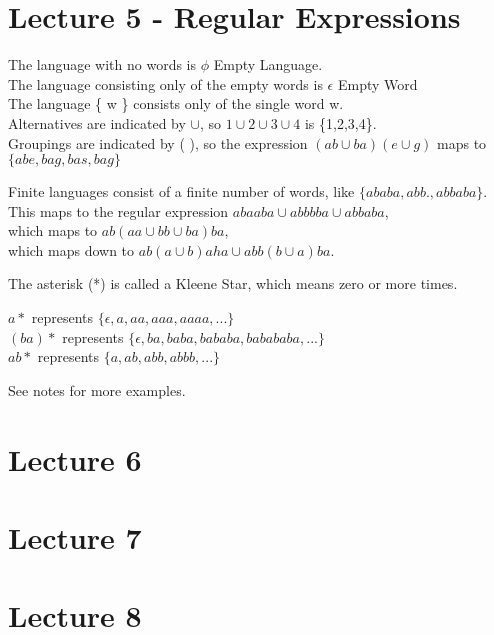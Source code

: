 \documentclass[11pt, oneside]{article}   	%
\begin{document}
\section{Lecture 5 - Regular Expressions}

The language with no words is  $\phi$ Empty Language.\\
The language consisting only of the empty words is  $\epsilon$      Empty Word \\
The language \{ w \} consists only of the single word w.\\

Alternatives are indicated by $\cup$, so $1\cup2\cup3\cup4$ is \{1,2,3,4\}.\\

Groupings are indicated by ( ), so the expression $(ab \cup ba)(e \cup g)$ maps to $\{abe,bag,bas,bag\}$

Finite languages consist of a finite number of words, like $\{ababa,abb.,abbaba\}$. \\This maps to the regular expression $abaaba\cup abbbba \cup abbaba$,\\ which maps to $ab(aa \cup bb \cup ba)ba$, \\which maps down to $ab(a \cup b)aha \cup abb(b \cup a)ba$.

The asterisk (*) is called a Kleene Star, which means zero or more times.

$a*$ represents $\{\epsilon, a,aa,aaa,aaaa,...\}$\\
$(ba)*$ represents $\{\epsilon, ba,baba,bababa,babababa,...\}$\\
$ab*$ represents $\{a,ab,abb,abbb,...\}$

See notes for more examples.


\section{Lecture 6}


\section{Lecture 7}


\section{Lecture 8}
\end{document}
